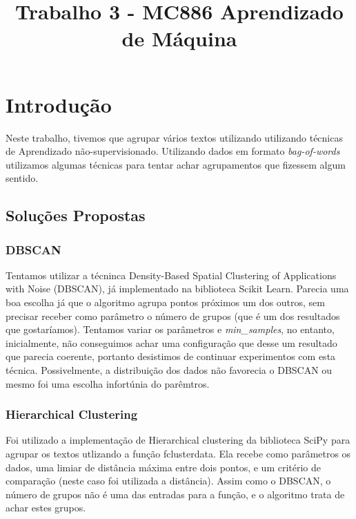 \documentclass[conference]{IEEEtran}
\begin{document}
\title{Trabalho 3 - MC886 Aprendizado de Máquina}

\author{
\and
{}
}

\maketitle

\section{Introdução}

Neste trabalho, tivemos que agrupar vários textos utilizando utilizando técnicas de Aprendizado não-supervisionado. Utilizando dados em formato \textit{bag-of-words} utilizamos algumas técnicas para tentar achar agrupamentos que fizessem algum sentido.

\subsection{Soluções Propostas}

\subsubsection{DBSCAN}
Tentamos utilizar a técninca Density-Based Spatial Clustering of Applications with Noise (DBSCAN), já implementado na biblioteca Scikit Learn. Parecia uma boa escolha já que o algoritmo agrupa pontos próximos um dos outros, sem precisar receber como parâmetro o número de grupos (que é um dos resultados que gostaríamos). Tentamos variar os parâmetros  e \textit{min\_samples}, no entanto, inicialmente, não conseguimos achar uma configuração que desse um resultado que parecia coerente, portanto desistimos de continuar experimentos com esta técnica. Possivelmente, a distribuição dos dados não favorecia o DBSCAN ou mesmo foi uma escolha infortúnia do parêmtros.

\subsubsection{Hierarchical Clustering}
Foi utilizado a implementação de Hierarchical clustering da biblioteca SciPy para agrupar os textos utlizando a função fclusterdata. Ela recebe como parâmetros os dados, uma limiar de distância máxima entre dois pontos, e um critério de comparação (neste caso foi utilizada a distância). Assim como o DBSCAN, o número de grupos não é uma das entradas para a função, e o algoritmo trata de achar estes grupos.
\end{document}
